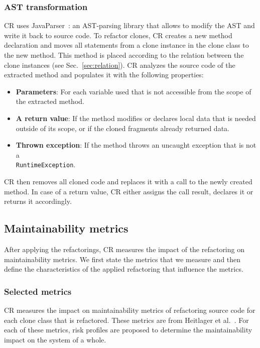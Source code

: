 \documentclass[sigconf,review,anonymous]{acmart}
\begin{document}
\subsubsection{AST transformation}
CR uses JavaParser~\cite{smith2017javaparser}: an AST-parsing library that allows to modify the AST and write it back to source code. To refactor clones, CR creates a new method declaration and moves all statements from a clone instance in the clone class to the new method. This method is placed according to the relation between the clone instances (see Sec.~\ref{sec:relation}). CR analyzes the source code of the extracted method and populates it with the following properties:
\begin{itemize}
  \item \textbf{Parameters}: For each variable used that is not accessible from the scope of the extracted method.
  \item \textbf{A return value}: If the method modifies or declares local data that is needed outside of its scope, or if the cloned fragments already returned data.
  \item \textbf{Thrown exception}: If the method throws an uncaught exception that is not a \\ \texttt{RuntimeException}.
\end{itemize}
CR then removes all cloned code and replaces it with a call to the newly created method. In case of a return value, CR either assigns the call result, declares it or returns it accordingly.

\subsection{Maintainability metrics}
After applying the refactorings, CR measures the impact of the refactoring on maintainability metrics. We first state the metrics that we measure and then define the characteristics of the applied refactoring that influence the metrics.

\subsubsection{Selected metrics} \label{sec:metrics}
CR measures the impact on maintainability metrics of refactoring source code for each clone class that is refactored. These metrics are from Heitlager et al.~\cite{heitlager2007practical}. For each of these metrics, risk profiles are proposed to determine the maintainability impact on the system of a whole.
\end{document}
